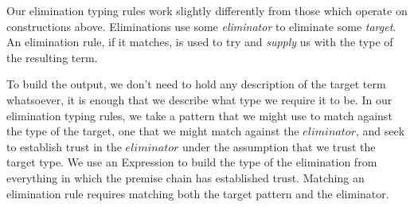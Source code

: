 Our elimination typing rules work slightly differently from those which operate on
constructions above. Eliminations use some \emph{eliminator} to eliminate
some \emph{target}. An elimination rule, if it matches, is used to try
and \emph{supply} us with the type of the resulting term.

To build the output, we don't need to hold any description
of the target term whatsoever, it is enough that we describe what type we require
it to be. In our elimination typing rules, we take a pattern that we might use to
match against the type of the target, one that we might match against the $eliminator$,
and seek to establish trust in the $eliminator$ under the assumption that we trust the
target type. We use an Expression to build the type of the elimination from everything
in which the premise chain has established trust. Matching an elimination rule requires
matching both the target pattern and the eliminator.
\begin{code}%
\>[0]\AgdaSpace{}%
\AgdaSpace{}%
\AgdaSymbol{:}\AgdaSpace{}%
\AgdaSpace{}%
\<%
\\
\>[0][@{}l@{\AgdaIndent{0}}]%
\>[2]\<%
\\
\>[2][@{}l@{\AgdaIndent{0}}]%
\>[4]%
\>[16]\AgdaSymbol{:}%
\>[19]\AgdaSpace{}%
\<%
\\
%
\>[4]%
\>[16]\AgdaSymbol{:}%
\>[19]\AgdaSpace{}%
\<%
\\
%
\>[4]%
\>[16]\AgdaSymbol{:}%
\>[19]\AgdaFunction{Σ[}\AgdaSpace{}%
\AgdaSpace{}%
\AgdaSpace{}%
\AgdaSpace{}%
\AgdaSpace{}%
\AgdaFunction{]}\AgdaSpace{}%
\AgdaSpace{}%
\AgdaSpace{}%
\AgdaSpace{}%
\<%
\\
%
\>[4]%
\>[16]\AgdaSymbol{:}%
\>[19]\AgdaSpace{}%
\AgdaSymbol{(}\AgdaSpace{}%
\AgdaSymbol{)}\AgdaSpace{}%
\AgdaSpace{}%
\<%
\end{code}
